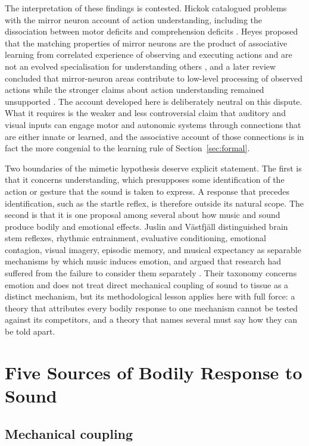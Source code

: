 \documentclass[11pt]{article}
\theoremstyle{plain}
\theoremstyle{definition}
\begin{document}
The interpretation of these findings is contested. Hickok catalogued problems with the mirror neuron account of action understanding, including the dissociation between motor deficits and comprehension deficits \citep{hickok2009}. Heyes proposed that the matching properties of mirror neurons are the product of associative learning from correlated experience of observing and executing actions and are not an evolved specialisation for understanding others \citep{heyes2010}, and a later review concluded that mirror-neuron areas contribute to low-level processing of observed actions while the stronger claims about action understanding remained unsupported \citep{heyes2022}. The account developed here is deliberately neutral on this dispute. What it requires is the weaker and less controversial claim that auditory and visual inputs can engage motor and autonomic systems through connections that are either innate or learned, and the associative account of those connections is in fact the more congenial to the learning rule of Section~\ref{sec:formal}.

Two boundaries of the mimetic hypothesis deserve explicit statement. The first is that it concerns understanding, which presupposes some identification of the action or gesture that the sound is taken to express. A response that precedes identification, such as the startle reflex, is therefore outside its natural scope. The second is that it is one proposal among several about how music and sound produce bodily and emotional effects. Juslin and V\"astfj\"all distinguished brain stem reflexes, rhythmic entrainment, evaluative conditioning, emotional contagion, visual imagery, episodic memory, and musical expectancy as separable mechanisms by which music induces emotion, and argued that research had suffered from the failure to consider them separately \citep{juslin2008}. Their taxonomy concerns emotion and does not treat direct mechanical coupling of sound to tissue as a distinct mechanism, but its methodological lesson applies here with full force: a theory that attributes every bodily response to one mechanism cannot be tested against its competitors, and a theory that names several must say how they can be told apart.

\section{Five Sources of Bodily Response to Sound}\label{sec:five}

\subsection{Mechanical coupling}
\end{document}
